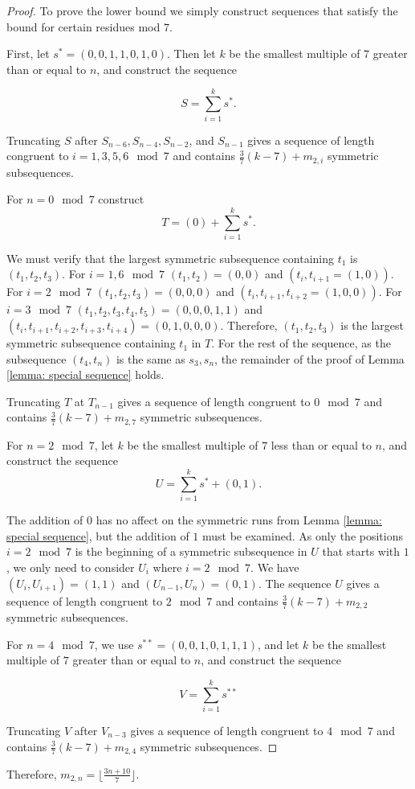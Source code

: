 \documentclass[12pt]{article}
\theoremstyle{plain}
\theoremstyle{definition}
\theoremstyle{remark}
\theoremstyle{definition}
\begin{document}
\begin{proof}
    To prove the lower bound we simply construct sequences that satisfy the bound for certain residues mod $7$.

    First, let $s^*=(0,0,1,1,0,1,0)$. Then let $k$ be the smallest multiple of $7$ greater than or equal to $n$, and construct the sequence 

        $$S = \sum_{i=1}^k s^*.$$

    Truncating $S$ after $S_{n-6}, S_{n-4}, S_{n-2}$, and $S_{n-1}$ gives a sequence of length congruent to $i=1,3,5,6 \mod 7$ and contains $\frac{3}{7}(k-7) + m_{2,i}$ symmetric subsequences. 

    For $n=0 \mod 7$ construct 
        $$T = (0) + \sum_{i=1}^k s^*.$$

    We must verify that the largest symmetric subsequence containing $t_1$ is $(t_1, t_2, t_3)$. For $i = 1,6 \mod 7$ $(t_1,t_2)=(0,0)$ and $(t_i,t_{i+1} = (1,0))$. For $i = 2 \mod 7$ $(t_1,t_2,t_3)=(0,0,0)$ and $(t_i,t_{i+1},t_{i+2} = (1,0,0))$. For $i = 3 \mod 7$ $(t_1,t_2,t_3,t_4,t_5)=(0,0,0,1,1)$ and $(t_{i}, t_{i+1}, t_{i+2}, t_{i+3}, t_{i+4})=(0,1,0,0,0)$. Therefore, $(t_1,t_2,t_3)$ is the largest symmetric subsequence containing $t_1$ in $T$. For the rest of the sequence, as the subsequence $(t_4, t_n)$ is the same as $s_3, s_n$, the remainder of the proof of Lemma \ref{lemma: special sequence} holds.

    Truncating $T$ at $T_{n-1}$ gives a sequence of length congruent to $0 \mod 7$ and contains $\frac{3}{7}(k-7) + m_{2,7}$ symmetric subsequences.

    For $n = 2 \mod 7$, let $k$ be the smallest multiple of $7$ less than or equal to $n$, and construct the sequence 
        $$U = \sum_{i=1}^k s^* + (0,1).$$

    The addition of $0$ has no affect on the symmetric runs from Lemma \ref{lemma: special sequence}, but the addition of $1$ must be examined. As only the positions $i=2 \mod 7$ is the beginning of a symmetric subsequence in $U$ that starts with $1$, we only need to consider $U_i$ where $i=2 \mod 7$. We have $(U_{i},U_{i+1})=(1,1)$ and $(U_{n-1}, U_{n})=(0,1)$. The sequence $U$ gives a sequence of length congruent to $2 \mod 7$ and contains $\frac{3}{7}(k-7) + m_{2,2}$ symmetric subsequences.
    
    For $n = 4 \mod 7$, we use $s^{**}=(0,0,1,0,1,1,1)$, and let $k$ be the smallest multiple of $7$ greater than or equal to $n$, and construct the sequence

    $$V = \sum_{i=1}^k s^{**}$$

    Truncating $V$ after $V_{n-3}$ gives a sequence of length congruent to $4 \mod 7$ and contains $\frac{3}{7}(k-7) + m_{2,4}$ symmetric subsequences.

\end{proof}

Therefore, $m_{2,n} = \lfloor \frac{3n+10}{7} \rfloor.$
\end{document}
